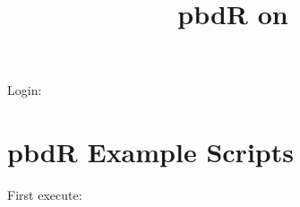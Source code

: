 \documentclass[a4paper,10pt]{article}
\title{pbdR on \whichcomp}
\author{}
\date{}
\begin{document}
\maketitle

\tokens

Login: \login


\section{pbdR Example Scripts}

First execute: \pbd

\settmp
\end{document}
